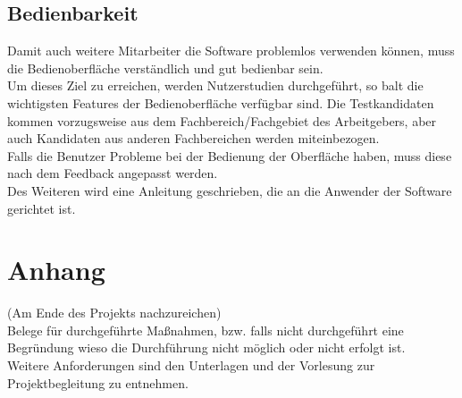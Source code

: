 \documentclass[accentcolor=tud9c,12pt,paper=a4]{tudreport}
\begin{document}
		\section{Bedienbarkeit}
		Damit auch weitere Mitarbeiter die Software problemlos verwenden können, muss die 
		Bedienoberfläche verständlich und gut bedienbar sein.
		\\[5pt]
		Um dieses Ziel zu erreichen, werden Nutzerstudien durchgeführt, so balt die 
		wichtigsten Features der Bedienoberfläche verfügbar sind.
		Die Testkandidaten kommen vorzugsweise aus dem
		Fachbereich/Fachgebiet des Arbeitgebers, aber auch Kandidaten aus anderen
		Fachbereichen werden miteinbezogen.
		\\[5pt]
		Falls die Benutzer Probleme bei der Bedienung der Oberfläche haben, muss 
		diese nach dem Feedback angepasst werden.
		\\[5pt]
		Des Weiteren wird eine Anleitung geschrieben, die an die Anwender der Software
		gerichtet ist.

\appendix
	\chapter{Anhang}
		(Am Ende des Projekts nachzureichen)\\
		Belege für durchgeführte Maßnahmen, bzw. falls nicht durchgeführt eine Begründung 
		wieso die Durchführung nicht möglich oder nicht erfolgt ist. \\
		Weitere Anforderungen sind den Unterlagen und der Vorlesung zur Projektbegleitung 
		zu entnehmen.
\end{document}
